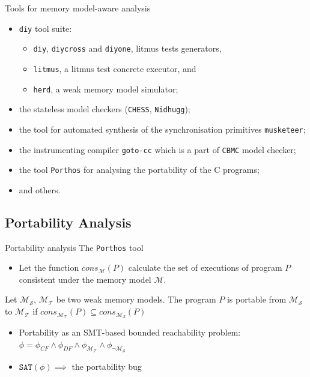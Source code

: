 \documentclass{beamer}
\newcommand{\tool}[1]{\texttt{#1}}
\begin{document}
\begin{frame}{Tools for memory model-aware analysis}
\begin{itemize}
\item \texttt{diy} tool suite:
  \begin{itemize}
  \item \tool{diy}, \tool{diycross} and \tool{diyone}, litmus tests generators,
  \item \tool{litmus}, a litmus test concrete executor, and 
  \item \tool{herd}, a weak memory model simulator;
  \end{itemize}
\item the stateless model checkers (\tool{CHESS}, \tool{Nidhugg}); %
\item the tool for automated synthesis of the synchronisation primitives \tool{musketeer};
\item the instrumenting compiler \tool{goto-cc} which is a part of \tool{CBMC} model checker;
\item the tool \texttt{Porthos} for analysing the portability of the C programs;
\item and others.
\end{itemize}
\end{frame}


\subsection{Portability Analysis}

\begin{frame}{Portability analysis} {The \texttt{Porthos} tool}

\begin{itemize}
\item Let the function $\textit{cons}_{\mathcal{M}}(P)$ calculate the set of executions of program $P$ consistent under the memory model $\mathcal{M}$.
\end{itemize}

\begin{definition}
Let $\mathcal{M_S}$, $\mathcal{M_T}$ be two weak memory models.
The program $P$ is portable from $\mathcal{M_S}$ to $\mathcal{M_T}$ if 
$\textit{cons}_{\mathcal{M_T}}(P) \subseteq \textit{cons}_{\mathcal{M_S}}(P)$
\end{definition}

\begin{itemize}
\item Portability as an SMT-based bounded reachability problem: \\
${\phi = \phi_{CF} \land \phi_{DF} \land \phi_{\mathcal{M_T}} \land \phi_{\lnot\mathcal{M_S}}}$
\item $\texttt{SAT}(\phi) \implies $ the portability bug
\end{itemize}

\end{frame}
\end{document}
